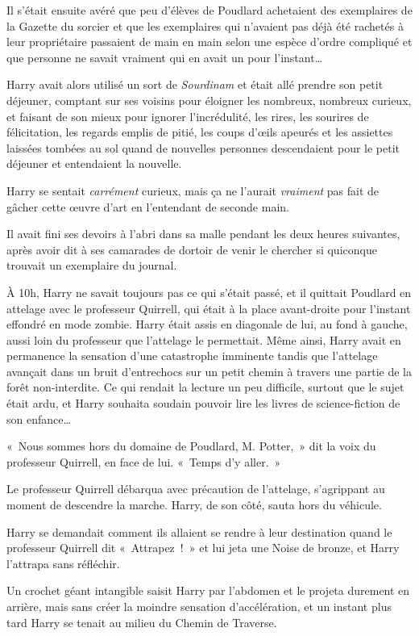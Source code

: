 Il s'était ensuite avéré que peu d'élèves de Poudlard achetaient des exemplaires de la Gazette du sorcier et que les exemplaires qui n'avaient pas déjà été rachetés à leur propriétaire passaient de main en main selon une espèce d'ordre compliqué et que personne ne savait vraiment qui en avait un pour l'instant…

Harry avait alors utilisé un sort de \emph{Sourdinam} et était allé prendre son petit déjeuner, comptant sur ses voisins pour éloigner les nombreux, nombreux curieux, et faisant de son mieux pour ignorer l'incrédulité, les rires, les sourires de félicitation, les regards emplis de pitié, les coups d'œils apeurés et les assiettes laissées tombées au sol quand de nouvelles personnes descendaient pour le petit déjeuner et entendaient la nouvelle.

Harry se sentait \emph{carrément} curieux, mais ça ne l'aurait \emph{vraiment} pas fait de gâcher cette œuvre d'art en l'entendant de seconde main.

Il avait fini ses devoirs à l'abri dans sa malle pendant les deux heures suivantes, après avoir dit à ses camarades de dortoir de venir le chercher si quiconque trouvait un exemplaire du journal.

À 10h, Harry ne savait toujours pas ce qui s'était passé, et il quittait Poudlard en attelage avec le professeur Quirrell, qui était à la place avant-droite pour l'instant effondré en mode zombie. Harry était assis en diagonale de lui, au fond à gauche, aussi loin du professeur que l'attelage le permettait. Même ainsi, Harry avait en permanence la sensation d'une catastrophe imminente tandis que l'attelage avançait dans un bruit d'entrechocs sur un petit chemin à travers une partie de la forêt non-interdite. Ce qui rendait la lecture un peu difficile, surtout que le sujet était ardu, et Harry souhaita soudain pouvoir lire les livres de science-fiction de son enfance…

«~Nous sommes hors du domaine de Poudlard, M. Potter,~» dit la voix du professeur Quirrell, en face de lui. «~Temps d'y aller.~»

Le professeur Quirrell débarqua avec précaution de l'attelage, s'agrippant au moment de descendre la marche. Harry, de son côté, sauta hors du véhicule.

Harry se demandait comment ils allaient se rendre à leur destination quand le professeur Quirrell dit «~Attrapez~!~» et lui jeta une Noise de bronze, et Harry l'attrapa sans réfléchir.

Un crochet géant intangible saisit Harry par l'abdomen et le projeta durement en arrière, mais sans créer la moindre sensation d'accélération, et un instant plus tard Harry se tenait au milieu du Chemin de Traverse.

